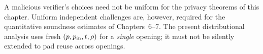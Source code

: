 \begin{remark}
A malicious verifier's choices need not be uniform for the
privacy theorems of this chapter. Uniform independent challenges
are, however, required for the quantitative soundness estimates
of Chapters~6--7. The present distributional analysis uses
fresh $(p,p_{\rm in},t,\rho)$ for a \emph{single} opening;
it must not be silently extended to pad reuse across openings.
\end{remark}
